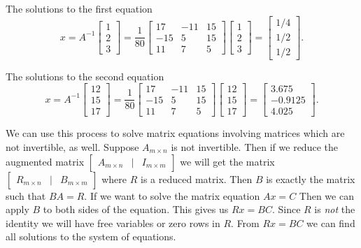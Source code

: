 \begin{example}
\begin{solution}
    The solutions to the first equation \[x = A^{-1}\begin{bmatrix}
        1 \\ 2\\ 3
    \end{bmatrix} = \frac{1}{80}\begin{bmatrix}
        17 & -11 & 15 \\
        -15 & 5 & 15 \\
        11 & 7 & 5
    \end{bmatrix}\begin{bmatrix}
        1 \\2 \\3
    \end{bmatrix} = \begin{bmatrix}
        1/4 \\ 1/2 \\ 1/2
    \end{bmatrix}.\]

    The solutions to the second equation \[x = A^{-1}\begin{bmatrix}
        12 \\ 15\\ 17
    \end{bmatrix} = \frac{1}{80}\begin{bmatrix}
        17 & -11 & 15 \\
        -15 & 5 & 15 \\
        11 & 7 & 5
    \end{bmatrix}\begin{bmatrix}
        12 \\15 \\17
    \end{bmatrix} = \begin{bmatrix}
        3.675 \\ -0.9125 \\ 4.025
    \end{bmatrix}.\]
    \end{solution}
\end{example}

We can use this process to solve matrix equations involving matrices which are not invertible, as well. Suppose \(A_{m \times n}\) is not invertible. Then if we reduce the augmented matrix \(\begin{bmatrix}
    A_{m\times n} & \vert & I_{m\times m}
\end{bmatrix}\) we will get the matrix \(\begin{bmatrix}
    R_{m \times n} & \vert & B_{m\times m}
\end{bmatrix}\) where \(R\) is a reduced matrix. Then \(B\) is exactly the matrix such that \(BA = R.\) If we want to solve the matrix equation \(Ax = C\) Then we can apply \(B\) to both sides of the equation. This gives us  \(Rx = BC.\) Since \(R\) is \emph{not} the identity we will have free variables or zero rows in \(R.\) From \(Rx = BC\) we can find all solutions to the system of equations.

